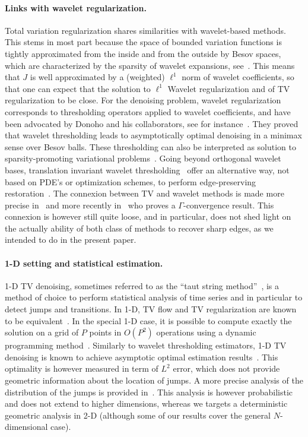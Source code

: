 \paragraph{Links with wavelet regularization.}

Total variation regularization shares similarities with wavelet-based methods. This stems in most part because the space of bounded variation functions is tightly approximated from the inside and from the outside by Besov spaces, which are characterized by the sparsity of wavelet expansions, see~\cite{CohenDevore01}. This means that $J$ is well approximated by a (weighted) $\ell^1$ norm of wavelet coefficients, so that one can expect that the solution to $\ell^1$ Wavelet regularization and of TV regularization to be close. For the denoising problem, wavelet regularization corresponds to thresholding operators applied to wavelet coefficients, and have been advocated by Donoho and his collaborators, see for instance~\cite{DonohoJohnstone1998}. They proved that wavelet thresholding leads to asymptotically optimal denoising in a minimax sense over Besov balls. These thresholding can also be interpreted as solution to sparsity-promoting variational problems~\cite{ChambolleDeVore98}. Going beyond orthogonal wavelet bases, translation invariant wavelet thresholding~\cite{CoifmanDonoho} offer an alternative way, not based on PDE's or optimization schemes, to perform edge-preserving restoration~\cite{ChambolleLucier01}.
%
The connexion between TV and wavelet methods is made more precise in~\cite{welk2008locally} and more recently in~\cite{cai2012image} who proves a $\Gamma$-convergence result. This connexion is however still quite loose, and in particular, does not shed light on the actually ability of both class of methods to recover sharp edges, as we intended to do in the present paper. 
\fi

\paragraph{1-D setting and statistical estimation.}

1-D TV denoising, sometimes referred to as the ``taut string method''~\cite{mammen1997}, is a method of choice to perform statistical analysis of time series and in particular to detect jumps and transitions. 
% 
In 1-D, TV flow and TV regularization are known to be equivalent~\cite{Ring00,Briani2011}. 
%
In the special 1-D case, it is possible to compute exactly the solution on a grid of $P$ points in $O(P^2)$ operations using a dynamic programming method~\cite{Condat13,Dumbgen2009,Grasmair2006,HinterbergerTube}.
%
Similarly to wavelet thresholding estimators, 1-D TV denoising is known to achieve asymptotic optimal estimation results~\cite{mammen1997}. This optimality is however measured in term of $L^2$ error, which does not provide geometric information about the location of jumps. A more precise analysis of the distribution of the jumps is provided in~\cite{davies2001}. This analysis is however probabilistic and does not extend to higher dimensions, whereas we targets a deterministic geometric analysis in 2-D (although some of our results cover the general $N$-dimensional case).



